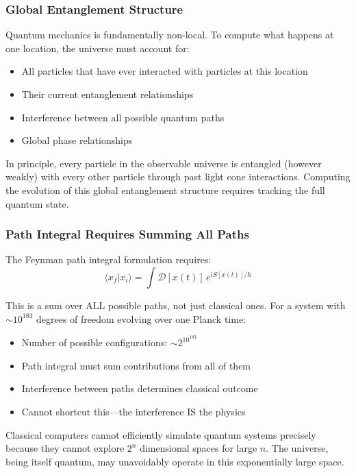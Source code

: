 \subsubsection{Global Entanglement Structure}

Quantum mechanics is fundamentally non-local. To compute what happens at one location, the universe must account for:
\begin{itemize}
\item All particles that have ever interacted with particles at this location
\item Their current entanglement relationships
\item Interference between all possible quantum paths
\item Global phase relationships
\end{itemize}

In principle, every particle in the observable universe is entangled (however weakly) with every other particle through past light cone interactions. Computing the evolution of this global entanglement structure requires tracking the full quantum state.

\subsubsection{Path Integral Requires Summing All Paths}

The Feynman path integral formulation requires:
\begin{equation}
\langle x_f | x_i \rangle = \int \mathcal{D}[x(t)] \, e^{iS[x(t)]/\hbar}
\end{equation}

This is a sum over ALL possible paths, not just classical ones. For a system with $\sim 10^{183}$ degrees of freedom evolving over one Planck time:
\begin{itemize}
\item Number of possible configurations: $\sim 2^{10^{183}}$
\item Path integral must sum contributions from all of them
\item Interference between paths determines classical outcome
\item Cannot shortcut this—the interference IS the physics
\end{itemize}

Classical computers cannot efficiently simulate quantum systems precisely because they cannot explore $2^n$ dimensional spaces for large $n$. The universe, being itself quantum, may unavoidably operate in this exponentially large space.

